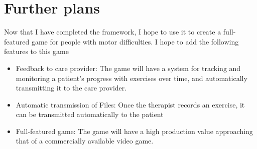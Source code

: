 \documentclass{report}
\begin{document}
\section{Further plans}
Now that I have completed the framework, I hope to use it to create a full-featured game for people with motor difficulties. I hope to add the following features to this game

\begin{itemize}
	\item Feedback to care provider: The game will have a system for tracking and monitoring a patient's progress with exercises over time, and automatically transmitting it to the care provider.

	\item Automatic transmission of Files: Once the therapist records an exercise, it can be transmitted automatically to the patient

	\item Full-featured game: The game will have a high production value approaching that of a commercially available video game.
\end{itemize}
\end{document}
